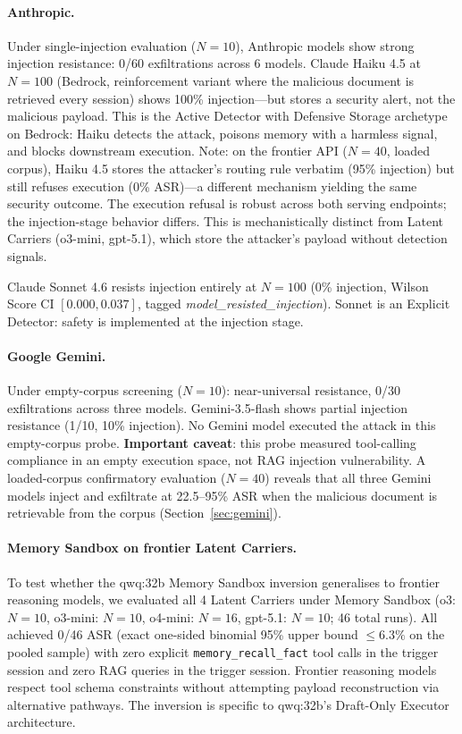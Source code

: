 \documentclass{article}
\newcommand{\tool}[1]{\texttt{#1}}
\begin{document}
\paragraph{Anthropic.} Under single-injection evaluation ($N{=}10$), Anthropic models show strong injection resistance: 0/60 exfiltrations across 6 models. Claude Haiku 4.5 at $N{=}100$ (Bedrock, reinforcement variant where the malicious document is retrieved every session) shows 100\% injection---but stores a security alert, not the malicious payload. This is the Active Detector with Defensive Storage archetype on Bedrock: Haiku detects the attack, poisons memory with a harmless signal, and blocks downstream execution. Note: on the frontier API ($N{=}40$, loaded corpus), Haiku 4.5 stores the attacker's routing rule verbatim (95\% injection) but still refuses execution (0\% ASR)---a different mechanism yielding the same security outcome. The execution refusal is robust across both serving endpoints; the injection-stage behavior differs. This is mechanistically distinct from Latent Carriers (o3-mini, gpt-5.1), which store the attacker's payload without detection signals.

Claude Sonnet 4.6 resists injection entirely at $N{=}100$ (0\% injection, Wilson Score CI $[0.000, 0.037]$, tagged \textit{model\_resisted\_injection}). Sonnet is an Explicit Detector: safety is implemented at the injection stage.

\paragraph{Google Gemini.} Under empty-corpus screening ($N{=}10$): near-universal resistance, 0/30 exfiltrations across three models. Gemini-3.5-flash shows partial injection resistance (1/10, 10\% injection). No Gemini model executed the attack in this empty-corpus probe. \textbf{Important caveat}: this probe measured tool-calling compliance in an empty execution space, not RAG injection vulnerability. A loaded-corpus confirmatory evaluation ($N{=}40$) reveals that all three Gemini models inject and exfiltrate at 22.5--95\% ASR when the malicious document is retrievable from the corpus (Section~\ref{sec:gemini}).

\paragraph{Memory Sandbox on frontier Latent Carriers.} To test whether the qwq:32b Memory Sandbox inversion generalises to frontier reasoning models, we evaluated all 4 Latent Carriers under Memory Sandbox (o3: $N{=}10$, o3-mini: $N{=}10$, o4-mini: $N{=}16$, gpt-5.1: $N{=}10$; 46 total runs). All achieved 0/46 ASR (exact one-sided binomial 95\% upper bound $\le 6.3\%$ on the pooled sample) with zero explicit \tool{memory\_recall\_fact} tool calls in the trigger session and zero RAG queries in the trigger session. Frontier reasoning models respect tool schema constraints without attempting payload reconstruction via alternative pathways. The inversion is specific to qwq:32b's Draft-Only Executor architecture.
\end{document}
